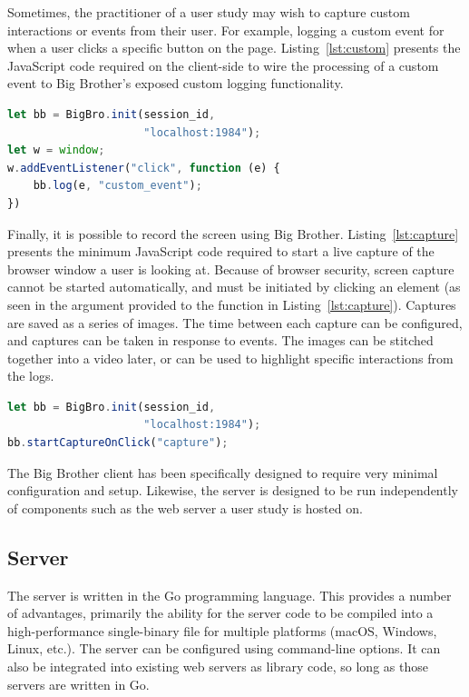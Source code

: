 \noindent
Sometimes, the practitioner of a user study may wish to capture custom interactions or events from their user. For example, logging a custom event for when a user clicks a specific button on the page. Listing~\ref{lst:custom} presents the JavaScript code required on the client-side to wire the processing of a custom event to Big Brother's exposed custom logging functionality.

\begin{lstlisting}[language=JavaScript, label=lst:custom, caption=Wiring up \bb to listen to click events and to log a custom event.]
let bb = BigBro.init(session_id, 
                     "localhost:1984");
let w = window;
w.addEventListener("click", function (e) {
    bb.log(e, "custom_event");
})
\end{lstlisting}

\noindent
Finally, it is possible to record the screen using Big Brother. Listing~\ref{lst:capture} presents the minimum JavaScript code required to start a live capture of the browser window a user is looking at. Because of browser security, screen capture cannot be started automatically, and must be initiated by clicking an element (as seen in the argument provided to the function in Listing~\ref{lst:capture}). Captures are saved as a series of images. The time between each capture can be configured, and captures can be taken in response to events. The images can be stitched together into a video later, or can be used to highlight specific interactions from the logs. 

\begin{lstlisting}[language=JavaScript, label=lst:capture, caption=Wiring up \bb to listen to click events and to log a custom event.]
let bb = BigBro.init(session_id, 
                     "localhost:1984");
bb.startCaptureOnClick("capture");
\end{lstlisting}


The Big Brother client has been specifically designed to require very minimal configuration and setup. Likewise, the server is designed to be run independently of components such as the web server a user study is hosted on.


\subsection{Server}

The server is written in the Go programming language. This provides a number of advantages, primarily the ability for the server code to be compiled into a high-performance single-binary file for multiple platforms (macOS, Windows, Linux, etc.). The server can be configured using command-line options. It can also be integrated into existing web servers as library code, so long as those servers are written in Go.

